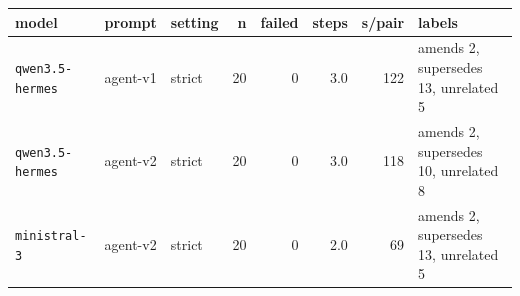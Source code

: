 \begin{tabular}{lllrrrrl}
\toprule
model & prompt & setting & n & failed & steps & s/pair & labels \\
\midrule
\texttt{qwen3.5-hermes} & agent-v1 & strict & 20 & 0 & 3.0 & 122 & amends 2, supersedes 13, unrelated 5 \\
\texttt{qwen3.5-hermes} & agent-v2 & strict & 20 & 0 & 3.0 & 118 & amends 2, supersedes 10, unrelated 8 \\
\texttt{ministral-3} & agent-v2 & strict & 20 & 0 & 2.0 & 69 & amends 2, supersedes 13, unrelated 5 \\
\bottomrule
\end{tabular}
